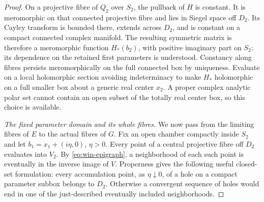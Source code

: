 \begin{proof}
On a projective fibre of $Q_2$ over $S_2$, the pullback of $H$ is constant.  It is meromorphic on that connected projective fibre and lies in Siegel space off $D_2$.  Its Cayley transform is bounded there, extends across $D_2$, and is constant on a compact connected complex manifold.  The resulting symmetric matrix is therefore a meromorphic function $H_*(b_2)$, with positive imaginary part on $S_2$; its dependence on the retained first parameters is understood. Constancy along fibres persists meromorphically on the full connected box by uniqueness.  Evaluate on a local holomorphic section avoiding indeterminacy to make $H_*$ holomorphic on a full smaller box about a generic real center $x_2$.  A proper complex analytic polar set cannot contain an open subset of the totally real center box, so this choice is available.

\emph{The fixed parameter domain and its whole fibres.} We now pass from the limiting fibres of $E$ to the actual fibres of $G$.  Fix an open chamber compactly inside $S_2$ and let $b_1=x_1+(i\eta,0)$, $\eta>0$.  Every point of a central projective fibre off $D_2$ evaluates into $V_2$.  By \eqref{eq:win-epigraph}, a neighborhood of each such point is eventually in the inverse image of $V$.  Properness gives the following useful closed-set formulation: every accumulation point, as $\eta\downarrow0$, of a hole on a compact parameter subbox belongs to $D_2$.  Otherwise a convergent sequence of holes would end in one of the just-described eventually included neighborhoods.


\end{proof}
